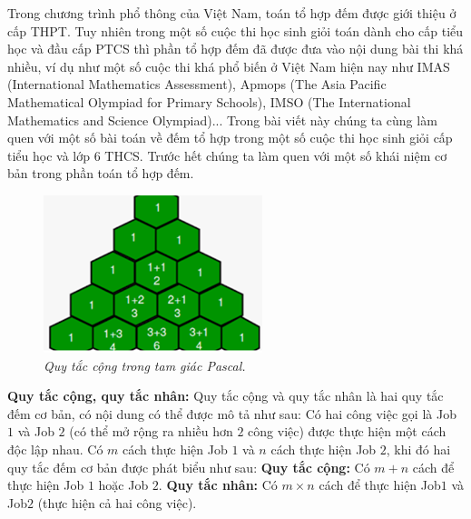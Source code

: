 \begin{multicols}{2}
	Trong chương trình phổ thông của Việt Nam, toán tổ hợp đếm được giới thiệu ở cấp THPT. Tuy nhiên trong một số cuộc thi học sinh giỏi toán dành cho cấp tiểu học và đầu cấp PTCS thì phần tổ hợp đếm đã được đưa vào nội dung bài thi khá nhiều, ví dụ như một số cuộc thi khá phổ biến ở Việt Nam hiện nay như IMAS (International Mathematics Assessment), Apmops (The Asia Pacific Mathematical Olympiad for Primary Schools), IMSO (The International Mathematics and Science Olympiad)...
	\vskip 0.1cm
	Trong bài viết này chúng ta cùng làm quen với một số bài toán về đếm tổ hợp trong một số cuộc thi học sinh giỏi cấp tiểu học và lớp $6$ THCS.
	\vskip 0.1cm
	Trước hết chúng ta làm quen với một số khái niệm cơ bản trong phần toán tổ hợp đếm.
	\begin{figure}[H]
			\centering
			\vspace*{-5pt}
			\captionsetup{labelformat=empty, justification=centering}
			\includegraphics[width=0.72\linewidth]{_1}
			\caption{\small\textit{\color{toancuabi}Quy tắc cộng trong tam giác Pascal.}}
			\vspace*{-10pt}
		\end{figure}
	\textbf{\color{toancuabi}Quy tắc cộng, quy tắc nhân:} Quy tắc cộng và quy tắc nhân là hai quy tắc đếm cơ bản, có nội dung có thể được mô tả như sau:
	\vskip 0.1cm
	Có hai công việc gọi là Job $1$ và Job $2$ (có thể mở rộng ra nhiều hơn $2$ công việc) được thực hiện một cách độc lập nhau. Có $m$ cách thực hiện Job $1$ và $n$ cách thực hiện Job $2$, khi đó hai quy tắc đếm cơ bản được phát biểu như sau:
	\vskip 0.1cm
	\textbf{\color{toancuabi}Quy tắc cộng:} Có $m+n$ cách để thực hiện Job $1$ hoặc Job $2$.
	\vskip 0.1cm
	\textbf{\color{toancuabi}Quy tắc nhân:} Có $m\times n$ cách để thực hiện Job$1$ và Job$2$ (thực hiện cả hai công việc).
	\begin{figure}[H]
		\centering

\end{figure}
\end{multicols}
